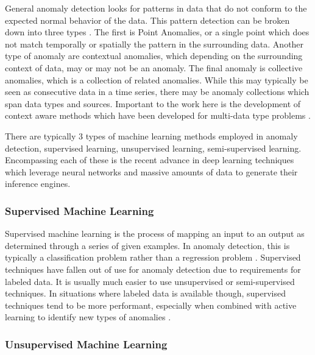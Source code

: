 General anomaly detection looks for patterns in data that do not conform to the expected normal behavior of the data.  This pattern detection can be broken down into three types \cite{chandolaAnomalyDetectionSurveya}. The first is Point Anomalies, or a single point which does not match temporally or spatially the pattern in the surrounding data.  Another type of anomaly are contextual anomalies, which depending on the surrounding context of data, may or may not be an anomaly.  The final anomaly is collective anomalies, which is a collection of related anomalies.  While this may typically be seen as consecutive data in a time series, there may be anomaly collections which span data types and sources. Important to the work here is the development of context aware methods which have been developed for multi-data type problems \cite{branisavljevicImprovedRealtimeData2011}.

There are typically 3 types of machine learning  methods employed in anomaly detection, supervised learning, unsupervised learning, semi-supervised learning.  Encompassing each of these is the recent advance in deep learning techniques which leverage neural networks and massive amounts of data to generate their inference engines.


\subsubsection{Supervised Machine Learning}


Supervised machine learning is the process of mapping an input to an output as determined through a series of given examples.  In anomaly detection, this is typically a classification problem rather than a regression problem \cite{chandolaAnomalyDetectionSurveya}. Supervised techniques have fallen out of use for anomaly detection due to requirements for labeled data. It is usually much easier to use unsupervised or semi-supervised techniques.  In situations where labeled data is available though, supervised techniques tend to be more performant, especially when combined with active learning to identify new types of anomalies \cite{goernitzSupervisedAnomalyDetection2013}.

 
\subsubsection{Unsupervised Machine Learning}

